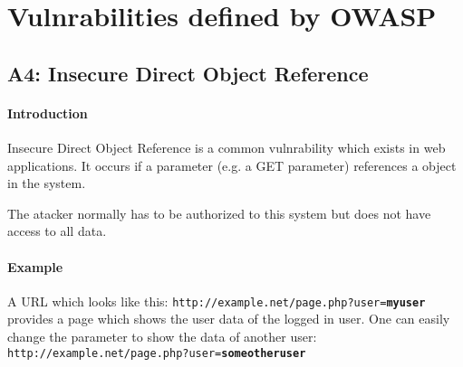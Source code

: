 \documentclass[11pt,twoside,a4paper]{article}
\title{\titleText}
\author{\authorText}
\date{\dateText}
\begin{document}
	\maketitle
	\tableofcontents
        
        \section{Vulnrabilities defined by OWASP}
        \subsection{A4: Insecure Direct Object Reference}
        
        \paragraph{Introduction}
        Insecure Direct Object Reference is a common vulnrability which exists
        in web applications. It occurs if a parameter (e.g. a GET parameter)
        references a object in the system. 

        The atacker normally has to be authorized to this system but does not
        have access to all data.
        
        \paragraph{Example}

        A URL which looks like this:
        \texttt{http://example.net/page.php?user=\textbf{myuser}} provides a
        page which shows the user data of the logged in user. One can easily
        change the parameter to show the data of another user:
        \texttt{http://example.net/page.php?user=\textbf{someotheruser}}
\end{document}
